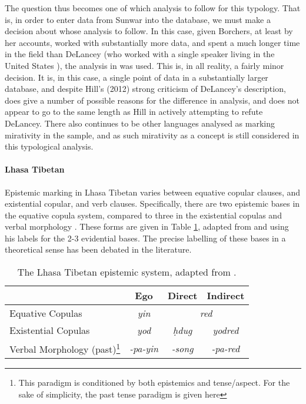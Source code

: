 The question thus becomes one of which analysis to follow for this typology. That is, in order to enter data from Sunwar into the database, we must make a decision about whose analysis to follow. In this case, given Borchers, at least by her accounts, worked with substantially more data, and spent a much longer time in the field than DeLancey (who worked with a single speaker living in the United States \cite{DeLanceyMirativity1997}), the analysis in  was used. This is, in all reality, a fairly minor decision. It is, in this case, a single point of data in a substantially larger database, and despite Hill's (2012) strong criticism of DeLancey's description,  does give a number of possible reasons for the difference in analysis, and does not appear to go to the same length as Hill in actively attempting to refute DeLancey. There also continues to be other languages analysed as marking mirativity in the sample, and as such mirativity as a concept is still considered in this typological analysis.

\paragraph{Lhasa Tibetan}
Epistemic marking in Lhasa Tibetan varies between equative copular clauses, and existential copular, and verb clauses. Specifically, there are two epistemic bases in the equative copula system, compared to three in the existential copulas and verbal morphology \cite{DeLancey2017Tibetan}. These forms are given in Table \ref{t:Description:LhasaEpistemics}, adapted from  and using his labels for the 2-3 evidential bases. The precise labelling of these bases in a theoretical sense has been debated in the literature.

\begin{table}
        \begin{tabular}{l|c|c|c}
         & Ego & Direct & Indirect \\ \hline
        Equative Copulas & \textit{yin} & \multicolumn{2}{c}{\textit{red}} \\
        Existential Copulas & \textit{yod} & \textit{ḥdug} & \textit{yodred} \\
        Verbal Morphology (past)\footnote{This paradigm is conditioned by both epistemics and tense/aspect. For the sake of simplicity, the past tense paradigm is given here} & \textit{-pa-yin} & \textit{-song} & \textit{-pa-red}
        \end{tabular}
        \caption{The Lhasa Tibetan epistemic system, adapted from .}\label{t:Description:LhasaEpistemics}
 \end{table}

